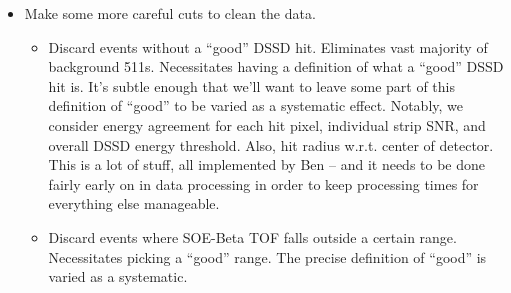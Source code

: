 \begin{itemize}
\begin{itemize}
		\end{itemize}
	\item Make some more careful cuts to clean the data.  
		\begin{itemize}
		\item Discard events without a ``good'' DSSD hit.  Eliminates vast majority of background 511s.  Necessitates having a definition of what a ``good'' DSSD hit is.  It's subtle enough that we'll want to leave some part of this definition of ``good'' to be varied as a systematic effect.  Notably, we consider energy agreement for each hit pixel, individual strip SNR, and overall DSSD energy threshold.  Also, hit radius w.r.t. center of detector.  This is a lot of stuff, all implemented by Ben -- and it needs to be done fairly early on in data processing in order to keep processing times for everything else manageable.  
		\item Discard events where SOE-Beta TOF falls outside a certain range.  Necessitates picking a ``good'' range.  The precise definition of ``good'' is varied as a systematic.
		\end{itemize}
\end{itemize}

